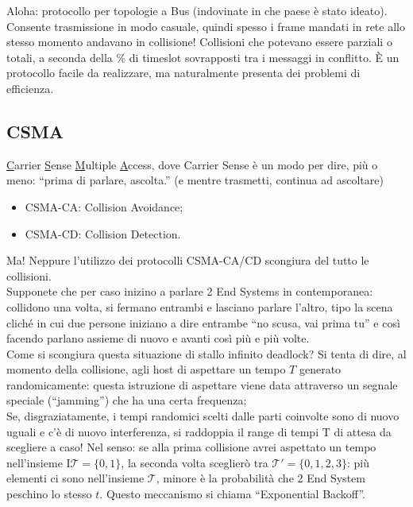 \noindent Aloha: protocollo per topologie a Bus (indovinate in che paese è stato ideato). Consente trasmissione in modo casuale, quindi spesso i frame mandati in rete allo stesso momento andavano in collisione! Collisioni che potevano essere parziali o totali, a seconda della \% di timeslot sovrapposti tra i messaggi in conflitto. È un protocollo facile da realizzare, ma naturalmente presenta dei problemi di efficienza.

\subsection*{CSMA}
\noindent \underline{C}arrier \underline{S}ense \underline{M}ultiple \underline{A}ccess, dove Carrier Sense è un modo per dire, più o meno: ``prima di parlare, ascolta.'' (e mentre trasmetti, continua ad ascoltare)

\begin{itemize}
    \item CSMA-CA: Collision Avoidance;
    \item CSMA-CD: Collision Detection.
\end{itemize}

\noindent Ma! Neppure l'utilizzo dei protocolli CSMA-CA/CD scongiura del tutto le collisioni.\\
\noindent Supponete che per caso inizino a parlare 2 End Systems in contemporanea: collidono una volta, si fermano entrambi e lasciano parlare l'altro, tipo la scena cliché in cui due persone iniziano a dire entrambe ``no scusa, vai prima tu'' e così facendo parlano assieme di nuovo e avanti così più e più volte.\\
\noindent Come si scongiura questa situazione di stallo infinito deadlock? Si tenta di dire, al momento della collisione, agli host di aspettare un tempo $T$ generato randomicamente: questa istruzione di aspettare viene data attraverso un segnale speciale (``jamming'') che ha una certa frequenza;\\
\noindent Se, disgraziatamente, i tempi randomici scelti dalle parti coinvolte sono di nuovo uguali e c'è di nuovo interferenza, si raddoppia il range di tempi T di attesa da scegliere a caso! Nel senso: se alla prima collisione avrei aspettato un tempo nell'insieme I$\mathcal{T}=\{0,1\}$, la seconda volta sceglierò tra $\mathcal{T}' = \{0,1,2,3\}$: più elementi ci sono nell'insieme $\mathcal{T}$, minore è la probabilità che 2 End System peschino lo stesso $t$. Questo meccanismo si chiama ``Exponential Backoff''.\\


